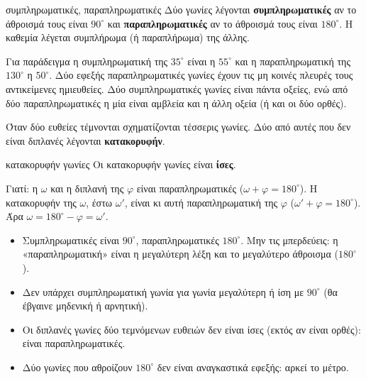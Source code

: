 
\begin{orismos}{συμπληρωματικές, παραπληρωματικές}
Δύο γωνίες λέγονται \textbf{συμπληρωματικές} αν το άθροισμά τους είναι $90^\circ$ και \textbf{παραπληρωματικές} αν το άθροισμά τους είναι $180^\circ$. Η καθεμία λέγεται συμπλήρωμα (ή παραπλήρωμα) της άλλης.
\end{orismos}

Για παράδειγμα η συμπληρωματική της $35^\circ$ είναι η $55^\circ$ και η παραπληρωματική της $130^\circ$ η $50^\circ$. Δύο εφεξής παραπληρωματικές γωνίες έχουν τις μη κοινές πλευρές τους αντικείμενες ημιευθείες. Δύο συμπληρωματικές γωνίες είναι πάντα οξείες, ενώ από δύο παραπληρωματικές η μία είναι αμβλεία και η άλλη οξεία (ή και οι δύο ορθές).


Όταν δύο ευθείες τέμνονται σχηματίζονται τέσσερις γωνίες. Δύο από αυτές που δεν είναι διπλανές λέγονται \textbf{κατακορυφήν}.

\begin{center}
\end{center}

\begin{idiotita}{κατακορυφήν γωνίες}
Οι κατακορυφήν γωνίες είναι \textbf{ίσες}.
\end{idiotita}

Γιατί: η $\omega$ και η διπλανή της $\varphi$ είναι παραπληρωματικές ($\omega+\varphi=180^\circ$). Η κατακορυφήν της $\omega$, έστω $\omega'$, είναι κι αυτή παραπληρωματική της $\varphi$ ($\omega'+\varphi=180^\circ$). Άρα $\omega=180^\circ-\varphi=\omega'$.

\begin{prosoxi}
\begin{itemize}[leftmargin=1.2em,itemsep=0.3ex,topsep=2pt]
\item Συμπληρωματικές είναι $90^\circ$, παραπληρωματικές $180^\circ$. Μην τις μπερδεύεις: η «παραπληρωματική» είναι η μεγαλύτερη λέξη και το μεγαλύτερο άθροισμα ($180^\circ$).
\item Δεν υπάρχει συμπληρωματική γωνία για γωνία μεγαλύτερη ή ίση με $90^\circ$ (θα έβγαινε μηδενική ή αρνητική).
\item Οι διπλανές γωνίες δύο τεμνόμενων ευθειών δεν είναι ίσες (εκτός αν είναι ορθές): είναι παραπληρωματικές.
\item Δύο γωνίες που αθροίζουν $180^\circ$ δεν είναι αναγκαστικά εφεξής: αρκεί το μέτρο.
\end{itemize}
\end{prosoxi}

